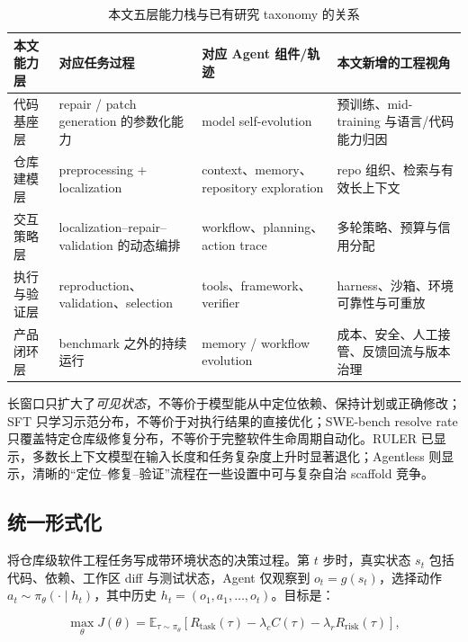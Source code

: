 \documentclass[10pt,a4paper,UTF8,fontset=none]{ctexart}
\begin{document}
\begin{table}[htbp]
\centering
\caption{本文五层能力栈与已有研究 taxonomy 的关系}
\label{tab:taxonomy-map}
\small
\begin{tabularx}{\textwidth}{p{2.5cm}YYY}
\toprule
本文能力层 & 对应任务过程 & 对应 Agent 组件/轨迹 & 本文新增的工程视角 \\
\midrule
代码基座层 & repair / patch generation 的参数化能力 & model self-evolution & 预训练、mid-training 与语言/代码能力归因 \\
仓库建模层 & preprocessing + localization & context、memory、repository exploration & repo 组织、检索与有效长上下文 \\
交互策略层 & localization--repair--validation 的动态编排 & workflow、planning、action trace & 多轮策略、预算与信用分配 \\
执行与验证层 & reproduction、validation、selection & tools、framework、verifier & harness、沙箱、环境可靠性与可重放 \\
产品闭环层 & benchmark 之外的持续运行 & memory / workflow evolution & 成本、安全、人工接管、反馈回流与版本治理 \\
\bottomrule
\end{tabularx}
\end{table}

\begin{keybox}[能力边界]
长窗口只扩大了\emph{可见状态}，不等价于模型能从中定位依赖、保持计划或正确修改；SFT 只学习示范分布，不等价于对执行结果的直接优化；SWE-bench resolve rate 只覆盖特定仓库级修复分布，不等价于完整软件生命周期自动化。RULER 已显示，多数长上下文模型在输入长度和任务复杂度上升时显著退化\cite{hsieh2024ruler}；Agentless 则显示，清晰的“定位--修复--验证”流程在一些设置中可与复杂自治 scaffold 竞争\cite{xia2024agentless}。
\end{keybox}

\subsection{统一形式化}

将仓库级软件工程任务写成带环境状态的决策过程。第 $t$ 步时，真实状态 $s_t$ 包括代码、依赖、工作区 diff 与测试状态，Agent 仅观察到 $o_t=g(s_t)$，选择动作 $a_t\sim\pi_\theta(\cdot\mid h_t)$，其中历史 $h_t=(o_1,a_1,\ldots,o_t)$。目标是：

\begin{equation}
\max_\theta J(\theta)=\mathbb{E}_{\tau\sim\pi_\theta}\left[R_{\mathrm{task}}(\tau)-\lambda_c C(\tau)-\lambda_r R_{\mathrm{risk}}(\tau)\right],
\label{eq:agent-objective}
\end{equation}
\end{document}
